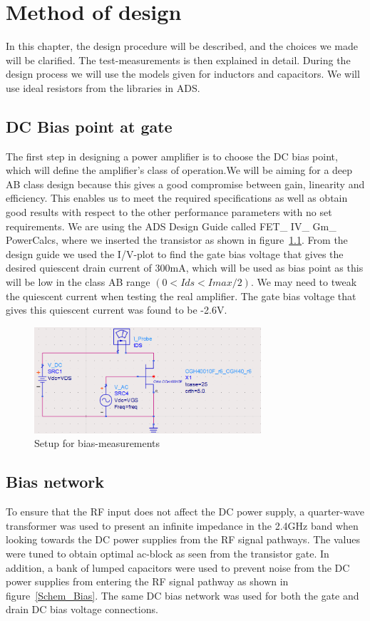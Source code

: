 \chapter{Method of design}
  In this chapter, the design procedure will be described, and the choices we made will be clarified. The test-measurements is then explained in detail. During the design process we will use the models given for inductors and capacitors. We will use ideal resistors from the libraries in ADS.
  \section{DC Bias point at gate}
    The first step in designing a power amplifier is to choose the DC bias point, which will define the amplifier’s class of operation.We will be aiming for a deep AB class design because this gives a good compromise between gain, linearity and efficiency. This enables us to meet the required specifications as well as obtain good results with respect to the other performance parameters with no set requirements.
    We are using the ADS Design Guide called FET\_ IV\_ Gm\_ PowerCalcs, where we inserted the transistor as shown in figure~\ref{fig:fig_bias_sim}. From the design guide we used the I/V-plot to find the gate bias voltage that gives the desired quiescent drain current of 300mA, which will be used as bias point as this will be low in the class AB range $(0 < Ids < Imax/2)$. We may need to tweak the quiescent current when testing the real amplifier. The gate bias voltage that gives this quiescent current was found to be -2.6V.

  \begin{figure}[h]
	  \centering
	  \includegraphics[width=0.75\textwidth]{img/IV_simulation}
	  \caption{Setup for bias-measurements}
	  \label{fig:fig_bias_sim}
  \end{figure}

  \section{Bias network}
  To ensure that the RF input does not affect the DC power supply, a quarter-wave transformer was used to present an infinite impedance in the 2.4GHz band when looking towards the DC power supplies from the RF signal pathways. The values were tuned to obtain optimal ac-block as seen from the transistor gate. In addition, a bank of lumped capacitors were used to prevent noise from the DC power supplies from entering the RF signal pathway as shown in figure~\ref{Schem_Bias}. The same DC bias network was used for both the gate and drain DC bias voltage connections.
  
